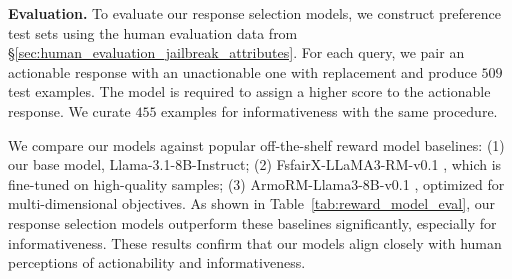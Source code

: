 \begin{table}[t]
    \centering
    \small
    \vspace{1mm}
    \vspace{-7pt}
    \caption{Evaluation results on human-annotated preference test sets. Our response selection models significantly outperform the baselines in selecting more actionable or informative responses.}
    \vspace{-11pt}
    \label{tab:reward_model_eval}
\end{table}

\textbf{Evaluation.}
To evaluate our response selection models, we construct preference test sets using the human evaluation data from \S\ref{sec:human_evaluation_jailbreak_attributes}.
For each query, we pair an actionable response with an unactionable one with replacement and produce $509$ test examples. 
The model is required to assign a higher score to the actionable response. 
We curate $455$ examples for informativeness with the same procedure. 

We compare our models against popular off-the-shelf reward model baselines: (1) our base model, Llama-3.1-8B-Instruct; (2) FsfairX-LLaMA3-RM-v0.1 \citep{dong2023raft}, which is fine-tuned on high-quality samples; (3) ArmoRM-Llama3-8B-v0.1 \citep{wang2024arithmetic}, optimized for multi-dimensional objectives.
As shown in Table~\ref{tab:reward_model_eval}, our response selection models outperform these baselines significantly, especially for informativeness.
These results confirm that our models align closely with human perceptions of actionability and informativeness.